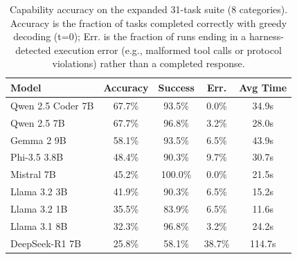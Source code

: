 \begin{table}[t]
\centering
\caption{Capability accuracy on the expanded 31-task suite (8 categories). Accuracy is the fraction of tasks completed correctly with greedy decoding (t=0); Err. is the fraction of runs ending in a harness-detected execution error (e.g., malformed tool calls or protocol violations) rather than a completed response.}
\label{tab:capability_v2}
\footnotesize
\begin{tabular}{lcccc}
\toprule
\textbf{Model} & \textbf{Accuracy} & \textbf{Success} & \textbf{Err.} & \textbf{Avg Time} \\
\midrule
        Qwen 2.5 Coder 7B & 67.7\% & 93.5\% & 0.0\% & 34.9s \\
        Qwen 2.5 7B & 67.7\% & 96.8\% & 3.2\% & 28.0s \\
        Gemma 2 9B & 58.1\% & 93.5\% & 6.5\% & 43.9s \\
        Phi-3.5 3.8B & 48.4\% & 90.3\% & 9.7\% & 30.7s \\
        Mistral 7B & 45.2\% & 100.0\% & 0.0\% & 21.5s \\
        Llama 3.2 3B & 41.9\% & 90.3\% & 6.5\% & 15.2s \\
        Llama 3.2 1B & 35.5\% & 83.9\% & 6.5\% & 11.6s \\
        Llama 3.1 8B & 32.3\% & 96.8\% & 3.2\% & 24.2s \\
        DeepSeek-R1 7B & 25.8\% & 58.1\% & 38.7\% & 114.7s \\
\bottomrule
\end{tabular}
\end{table}